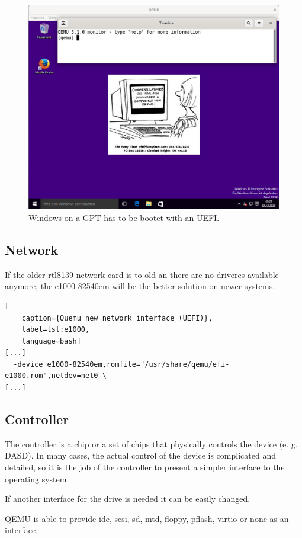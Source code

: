 \begin{figure}[htbp]  %
  \centering
  \includegraphics[width=.75\textwidth]{figures/boot-uefi-win10ee-qxl.png}
  \caption[Qemu UEFI]{Windows on a GPT has to be bootet with an UEFI.}
  \label{fig:uefi}
\end{figure}

\subsection{Network}

If the older rtl8139 network card is to old an there are no driveres available anymore, the e1000-82540em will be the better solution on newer systems.

\begin{lstlisting}[
    caption={Quemu new network interface (UEFI)},
    label=lst:e1000,
    language=bash]
[...]
  -device e1000-82540em,romfile="/usr/share/qemu/efi-e1000.rom",netdev=net0 \
[...]
\end{lstlisting}

\subsection{Controller}

The controller is a chip or a set of chips that physically controls the device (e. g. DASD). In many cases, the actual control of the device is complicated and detailed, so it is the job of the controller to present a simpler interface to the operating system. \cite{Tanenbaum2014:28}

If another interface for the drive is needed it can be easily changed.

QEMU is able to provide ide, scsi, sd, mtd, floppy, pflash, virtio or none as an interface.

